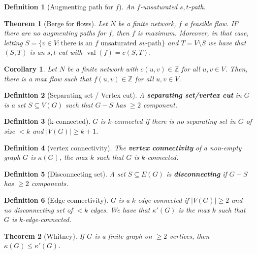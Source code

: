 \documentclass{article}
\newcommand{\Z}{\mathbb{Z}}
\newcommand{\size}[1]{|#1|}
\newcommand{\set}[1]{\{#1\}}
\newcommand{\st}{such that }
\DeclareMathOperator*{\val}{val}
\newtheorem*{definition}{Definition}
\newtheorem*{theorem}{Theorem}
\newtheorem*{corollary}{Corollary}
\begin{document}
\begin{definition}[Augmenting path for $f$]
    An $ f $-unsaturated $ s,t $-path.
\end{definition}

\begin{theorem}[Berge for flows]
    Let $ N $ be a finite network, $ f $ a feasible flow. IF there are no augmenting paths for $ f $, then $ f $ is maximum.
    Moreover, in that case, letting $ S = \set{v \in V: \text{there is an $f$ unsaturated $sv$-path}} $ and $ T = V \setminus S $
    we have that $ (S,T) $ is an $ s,t $-cut with $ \val(f) = c(S, T) $.
\end{theorem}

\begin{corollary}
    Let $ N $ be a finite network with $ c(u,v) \in \Z $ for all $ u,v \in V $. Then, there is a max flow such that
    $ f(u,v) \in \Z $ for all $ u,v \in V $.
\end{corollary}

\begin{definition}[Separating set / Vertex cut]
    A \textbf{separating set/vertex cut} in $ G $ is a set $ S \subseteq V(G) $ \st $ G - S $ has $ \geq 2 $ component.
\end{definition}

\begin{definition}[k-connected]
    $ G $ is $ k $-connected if there is no separating set in $ G $ of size $ < k $ and $ \size{V(G)} \geq k + 1 $.
\end{definition}

\begin{definition}[vertex connectivity]
    The \textbf{vertex connectivity} of a non-empty graph $ G $ is $ \kappa(G) $, the max $ k $ \st $ G $ is $ k $-connected.
\end{definition}

\begin{definition}[Disconnecting set]
    A set $ S \subseteq E(G) $ is \textbf{disconnecting} if $ G - S $ has $ \geq 2 $ components.
\end{definition}

\begin{definition}[Edge connectivity]
    $ G $ is a $ k $-edge-connected if $ \size{V(G)} \geq 2 $ and no disconnecting set of $ < k $ edges. We have that
    $ \kappa'(G) $ is the max $ k $ \st $ G $ is $ k $-edge-connected.
\end{definition}

\begin{theorem}[Whitney]
    If $ G $ is a finite graph on $ \geq 2 $ vertices, then $ \kappa(G) \leq \kappa'(G) $.
\end{theorem}
\end{document}
